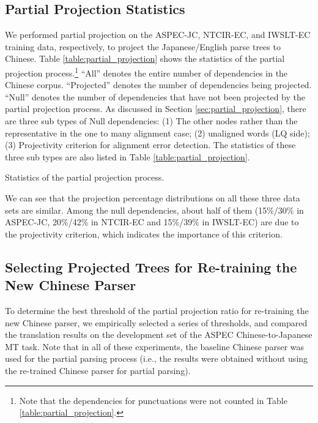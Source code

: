 \documentclass[english]{jnlp_1.4}
\begin{document}
\subsection{Partial Projection Statistics}

We performed partial projection on the ASPEC-JC, NTCIR-EC, and {IWSLT-EC} training data, respectively, to project the 
Japanese/English parse trees to Chinese. Table \ref{table:partial_projection} shows the statistics of the partial projection 
process.\footnote{Note that the dependencies for punctuations were not counted in Table \ref{table:partial_projection}.}
``All'' denotes the entire number of dependencies in the Chinese corpus. ``Projected'' denotes
the number of dependencies being projected. ``Null'' denotes the number of dependencies that
have not been projected by the partial projection process. As discussed in Section \ref{sec:partial_projection},
there are three sub types of Null dependencies: (1) The other nodes rather than the representative in the 
one to many alignment case; (2) unaligned words (LQ side); (3) Projectivity criterion for alignment 
error detection. The statistics of these three sub types are also listed in Table \ref{table:partial_projection}.

\begin{table}[b]
\caption{Statistics of the partial projection process.}
\label{table:partial_projection}

\end{table}

We can see that the projection percentage distributions on all these three data sets are similar.
Among the null dependencies, about half of them (15\%/30\% in ASPEC-JC, 20\%/42\% in NTCIR-EC and 15\%/39\% in IWSLT-EC) 
are due to the projectivity criterion, which indicates the importance of this criterion.


\subsection{Selecting Projected Trees for Re-training the New Chinese Parser}
\label{sec:experiments_selection}

{To determine the best threshold of the partial projection ratio for re-training 
the new Chinese parser, we empirically selected a series of thresholds, and compared the translation results
on the development set of the ASPEC Chinese-to-Japanese MT task. Note that in all of these
experiments, the baseline Chinese parser was used for the partial parsing process (i.e., the 
results were obtained without using the re-trained Chinese parser for partial parsing).}
\end{document}
